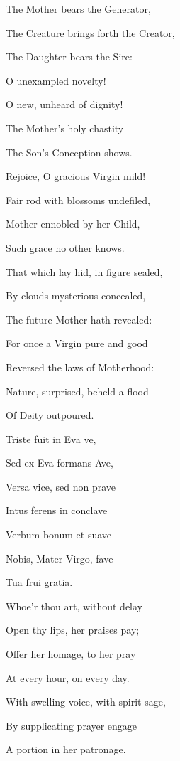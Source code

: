 \begin{multicols}{2}
\begin{hangparas}{1.25em}{1}
The Mother bears the Generator,

The Creature brings forth the Creator,

The Daughter bears the Sire:

\vspace{2ex}

O unexampled novelty!

O new, unheard of dignity!

The Mother's holy chastity

The Son's Conception shows.

Rejoice, O gracious Virgin mild!

Fair rod with blossoms undefiled,

Mother ennobled by her Child,

Such grace no other knows.

\vspace{2ex}

That which lay hid, in figure sealed,

By clouds mysterious concealed,

The future Mother hath revealed:

For once a Virgin pure and good

Reversed the laws of Motherhood:

Nature, surprised, beheld a flood

Of Deity outpoured.

\vspace{2ex}

Triste fuit in Eva ve,

Sed ex Eva formans Ave,

Versa vice, sed non prave

Intus ferens in conclave

Verbum bonum et suave

Nobis, Mater Virgo, fave

Tua frui gratia.

\vspace{2ex}

Whoe'r thou art, without delay

Open thy lips, her praises pay;

Offer her homage, to her pray

At every hour, on every day.

With swelling voice, with spirit sage,

By supplicating prayer engage

A portion in her patronage.


\end{hangparas}
\end{multicols}
